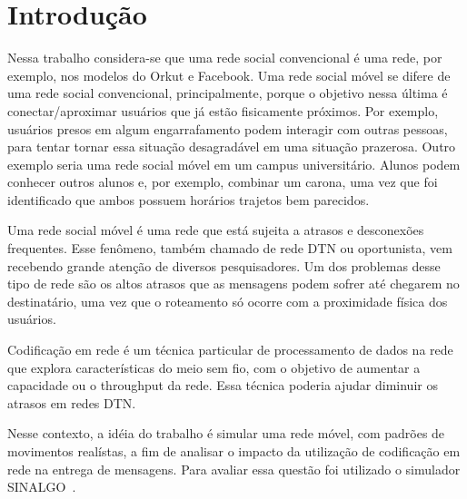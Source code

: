 \section{Introdução}

Nessa trabalho considera-se que uma rede social convencional é uma rede,
por exemplo, nos modelos do Orkut e Facebook.  Uma rede social móvel se
difere de uma rede social convencional, principalmente, porque o
objetivo nessa última é conectar/aproximar usuários que já estão
fisicamente próximos. Por exemplo, usuários presos em algum
engarrafamento podem interagir com outras pessoas, para tentar tornar
essa situação desagradável em uma situação prazerosa. Outro exemplo
seria uma rede social móvel em um campus universitário. Alunos podem
conhecer outros alunos e, por exemplo, combinar  um carona, uma vez que
foi identificado que ambos possuem horários trajetos bem parecidos.

Uma rede social móvel é uma rede que está sujeita a atrasos e
desconexões frequentes. Esse fenômeno, também chamado de rede DTN ou
oportunista, vem recebendo grande atenção de diversos pesquisadores. Um
dos problemas desse tipo de rede são os altos atrasos que as mensagens
podem sofrer até chegarem no destinatário, uma vez que o roteamento só
ocorre com a proximidade física dos usuários.

Codificação em rede é um técnica particular de processamento de dados na
rede que explora características do meio sem fio, com o objetivo de
aumentar a capacidade ou o throughput da rede. Essa técnica poderia
ajudar diminuir os atrasos em redes DTN.

Nesse contexto, a idéia do trabalho é simular uma rede móvel, com
padrões de movimentos realístas, a fim de analisar o impacto da
utilização de codificação em rede na entrega de mensagens. Para avaliar
essa questão foi utilizado o simulador SINALGO~\cite{sinalgo}.
